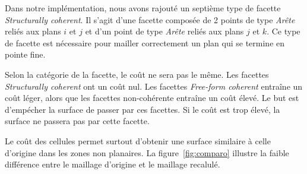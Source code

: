 \documentclass[12pt, twoside]{article}
\begin{document}
Dans notre implémentation, nous avons rajouté un septième type de facette \textit{Structurally coherent}. Il s'agit d'une facette composée de 2 points de type \textit{Arête} reliés aux plans $i$ et $j$ et d'un point de type \textit{Arête} reliés aux plans $j$ et $k$. Ce type de facette est nécessaire pour mailler correctement un plan qui se termine en pointe fine.

Selon la catégorie de la facette, le coût ne sera pas le même. Les facettes \textit{Structurally coherent} ont un coût nul. Les facettes \textit{Free-form coherent} entraîne un coût léger, alors que les facettes non-cohérente entraîne un coût élevé. Le but est d'empécher la surface de passer par ces facettes. Si le coût est trop élevé, la surface ne passera pas par cette facette.

Le coût des cellules permet surtout d'obtenir une surface similaire à celle d'origine dans les zones non planaires. La figure~\ref{fig:comparo} illustre la faible différence entre le maillage d'origine et le maillage recalulé.
\end{document}
